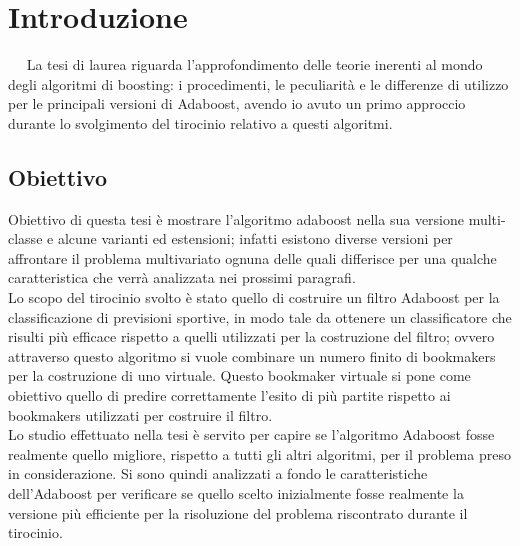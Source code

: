 \chapter{Introduzione}
\ \
\newline
La tesi di laurea riguarda l'approfondimento
delle teorie inerenti al mondo degli algoritmi di boosting: i procedimenti, le peculiarit\`a e le differenze 
di utilizzo per le principali versioni di Adaboost, avendo io 
avuto un primo approccio durante lo 
svolgimento del tirocinio relativo a questi algoritmi.\\
\section{Obiettivo}
Obiettivo di questa tesi \`e mostrare l'algoritmo adaboost nella sua versione multi-classe e alcune varianti 
ed estensioni; infatti esistono diverse versioni per affrontare il problema multivariato 
ognuna delle quali differisce per una qualche caratteristica che verr\`a analizzata nei prossimi paragrafi.\\
Lo scopo del tirocinio svolto \`e stato quello di costruire un filtro Adaboost per la classificazione di previsioni sportive, in modo tale da
ottenere un classificatore che risulti pi\`u efficace rispetto a quelli 
utilizzati per la costruzione del filtro; ovvero attraverso questo algoritmo si 
vuole combinare un numero finito di bookmakers per la costruzione di uno virtuale.
Questo bookmaker virtuale si pone come obiettivo quello di predire correttamente l'esito di pi\`u 
partite rispetto ai bookmakers utilizzati per costruire il filtro.\\
Lo studio effettuato nella tesi \`e servito per capire se l'algoritmo Adaboost fosse realmente quello migliore, 
rispetto a tutti gli altri algoritmi, per
il problema preso in considerazione. Si sono quindi analizzati a fondo le caratteristiche dell'Adaboost per 
verificare se quello scelto inizialmente fosse realmente la versione pi\`u efficiente per 
la risoluzione del problema riscontrato durante il tirocinio. 


\newpage
\vspace{1.5cm}

